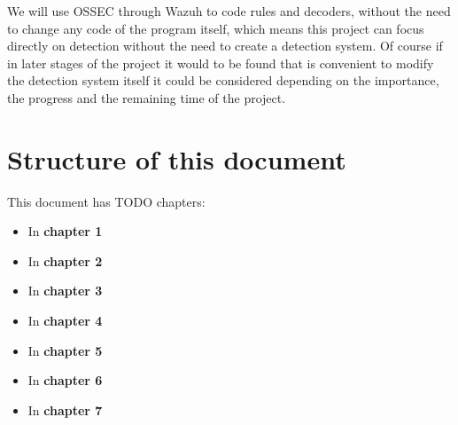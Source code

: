 \linej
We will use OSSEC through Wazuh to code rules and decoders, without the need to change any code of the program itself, which means this project can focus directly on detection without the need to create a detection system. Of course if in later stages of the project it would to be found that is convenient to modify the detection system itself it could be considered depending on the importance, the progress and the remaining time of the project.


\section{Structure of this document}
This document has TODO chapters:
\begin{itemize}
	\item In \textbf{chapter 1} 
	\item In \textbf{chapter 2} 
	\item In \textbf{chapter 3} 
	\item In \textbf{chapter 4} 
	\item In \textbf{chapter 5} 
	\item In \textbf{chapter 6} 
	\item In \textbf{chapter 7} 
\end{itemize}
